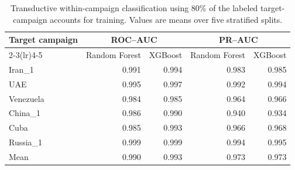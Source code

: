 \begin{table}[H]
    \centering
    \begin{tabular}{lrrrr}
        \toprule
        Target campaign & \multicolumn{2}{c}{ROC--AUC} & \multicolumn{2}{c}{PR--AUC} \\
        \cmidrule(lr){2-3}\cmidrule(lr){4-5}
         & Random Forest & XGBoost & Random Forest & XGBoost \\
        \midrule
        Iran\_1    & 0.991 & 0.994 & 0.983 & 0.985 \\
        UAE        & 0.995 & 0.997 & 0.992 & 0.994 \\
        Venezuela  & 0.984 & 0.985 & 0.964 & 0.966 \\
        China\_1   & 0.986 & 0.990 & 0.940 & 0.934 \\
        Cuba       & 0.985 & 0.993 & 0.966 & 0.968 \\
        Russia\_1  & 0.999 & 0.999 & 0.994 & 0.995 \\
        \midrule
        Mean       & 0.990 & 0.993 & 0.973 & 0.973 \\
        \bottomrule
    \end{tabular}
    \caption{Transductive within-campaign classification using 80\% of the
    labeled target-campaign accounts for training. Values are means over five
    stratified splits.}
    \label{tab:transductive-within-campaign-auc-80pct}
\end{table}
